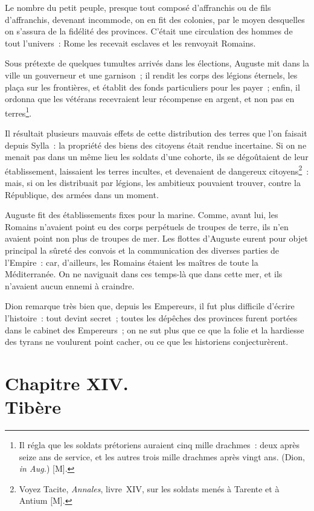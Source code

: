 \documentclass[french,twoside]{book} %
\newcommand\chapteropen{} %
\newcommand\chapterclose{} %
\begin{document}
Le nombre du petit peuple, presque tout composé d’affranchis ou de fils d’affranchis, devenant incommode, on en fit des colonies, par le moyen desquelles on s’assura de la fidélité des provinces. C’était une circulation des hommes de tout l’univers : Rome les recevait esclaves et les renvoyait Romains.\par
Sous prétexte de quelques tumultes arrivés dans les élections, Auguste mit dans la ville un gouverneur et une garnison ; il rendit les corps des légions éternels, les plaça sur les frontières, et établit des fonds particuliers pour les payer ; enfin, il ordonna que les vétérans recevraient leur récompense en argent, et non pas en terres\footnote{Il régla que les soldats prétoriens auraient cinq mille drachmes : deux après seize ans de service, et les autres trois mille drachmes après vingt ans. (Dion, {\itshape in Aug.}) [M].}.\par
Il résultait plusieurs mauvais effets de cette distribution des terres que l’on faisait depuis Sylla : la propriété des biens des citoyens était rendue incertaine. Si on ne menait pas dans un même lieu les soldats d’une cohorte, ils se dégoûtaient de leur établissement, laissaient les terres incultes, et devenaient de dangereux citoyens\footnote{Voyez Tacite, {\itshape Annales}, livre XIV, sur les soldats menés à Tarente et à Antium [M].} : mais, si on les distribuait par légions, les ambitieux pouvaient trouver, contre la République, des armées dans un moment.\par
Auguste fit des établissements fixes pour la marine. Comme, avant lui, les Romains n’avaient point eu des corps perpétuels de troupes de terre, ils n’en avaient point non plus de troupes de mer. Les flottes d’Auguste eurent pour objet principal la sûreté des convois et la communication des diverses parties de l’Empire : car, d’ailleurs, les Romains étaient les maîtres de toute la Méditerranée. On ne naviguait dans ces temps-là que dans cette mer, et ils n’avaient aucun ennemi à craindre.\par
Dion remarque très bien que, depuis les Empereurs, il fut plus difficile d’écrire l’histoire : tout devint secret ; toutes les dépêches des provinces furent portées dans le cabinet des Empereurs ; on ne sut plus que ce que la folie et la hardiesse des tyrans ne voulurent point cacher, ou ce que les historiens conjecturèrent.
\chapterclose


\chapteropen
\chapter[{Chapitre XIV. Tibère}]{Chapitre XIV. \\
Tibère}
\label{considérations\_Romains\_chap\_14}\renewcommand{\leftmark}{Chapitre XIV. \\
Tibère}
\end{document}
